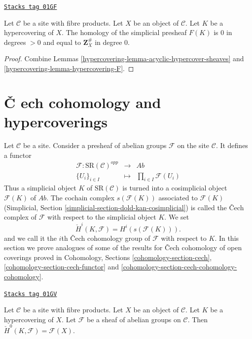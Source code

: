\begin{lemma}
\label{hypercovering-lemma-hypercovering-acyclic}
\href{https://stacks.math.columbia.edu/tag/01GF}{\texttt{Stacks tag 01GF}}

Let $\mathcal{C}$ be a site with fibre products.
Let $X$ be an object of $\mathcal{C}$.
Let $K$ be a hypercovering of $X$.
The homology of the simplicial presheaf $F(K)$ is
$0$ in degrees $> 0$ and equal to $\mathbf{Z}_X^\#$
in degree $0$.
\end{lemma}

\begin{proof}

Combine Lemmas \ref{hypercovering-lemma-acyclic-hypercover-sheaves}
and \ref{hypercovering-lemma-hypercovering-F}.
\end{proof}

\section{{\v C}
ech cohomology and hypercoverings}
\label{hypercovering-section-hyper-cech}

Let $\mathcal{C}$ be a site. Consider a presheaf of
abelian groups $\mathcal{F}$ on the site $\mathcal{C}$.
It defines a functor
\begin{eqnarray*}
\mathcal{F} : \text{SR}(\mathcal{C})^{opp}
& \longrightarrow &
\textit{Ab} \\
\{U_i\}_{i \in I} &
\longmapsto &
\prod\nolimits_{i \in I} \mathcal{F}(U_i)
\end{eqnarray*}
Thus a simplicial object $K$ of $\text{SR}(\mathcal{C})$
is turned into a cosimplicial object $\mathcal{F}(K)$ of $\textit{Ab}$.
The cochain complex $s(\mathcal{F}(K))$ associated to $\mathcal{F}(K)$
(Simplicial, Section
\ref{simplicial-section-dold-kan-cosimplicial})
is called the {\v C}ech complex of $\mathcal{F}$ with
respect to the simplicial object $K$. We set
$$
\check{H}^i(K, \mathcal{F})
=
H^i(s(\mathcal{F}(K))).
$$
and we call it the $i$th {\v C}ech cohomology group
of $\mathcal{F}$ with respect to $K$.
In this section we prove analogues of some of the results for
{\v C}ech cohomology of open coverings proved in
Cohomology, Sections \ref{cohomology-section-cech},
\ref{cohomology-section-cech-functor} and
\ref{cohomology-section-cech-cohomology-cohomology}.

\begin{lemma}[H0 cech]
\label{hypercovering-lemma-h0-cech}
\href{https://stacks.math.columbia.edu/tag/01GV}{\texttt{Stacks tag 01GV}}

Let $\mathcal{C}$ be a site with fibre products.
Let $X$ be an object of $\mathcal{C}$.
Let $K$ be a hypercovering of $X$.
Let $\mathcal{F}$ be a sheaf of abelian groups on $\mathcal{C}$.
Then $\check{H}^0(K, \mathcal{F}) = \mathcal{F}(X)$.
\end{lemma}


